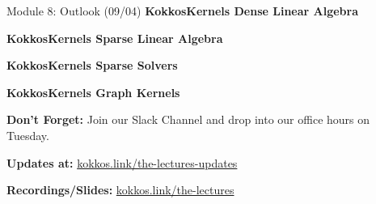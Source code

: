 \begin{frame}{Module 8: Outlook (09/04)}
	\textbf{KokkosKernels Dense Linear Algebra}

	\textbf{KokkosKernels Sparse Linear Algebra}

	\textbf{KokkosKernels Sparse Solvers}

	\textbf{KokkosKernels Graph Kernels}


	\vspace{5pt}
	\textbf{Don't Forget:} Join our Slack Channel and drop into our office hours on Tuesday.
	
	\vspace{5pt}
	\textbf{Updates at:} \href{https://kokkos.link/the-lectures-updates}{kokkos.link/the-lectures-updates}
	
	\vspace{5pt}
	\textbf{Recordings/Slides:} \href{https://kokkos.link/the-lectures}{kokkos.link/the-lectures}

\end{frame}


